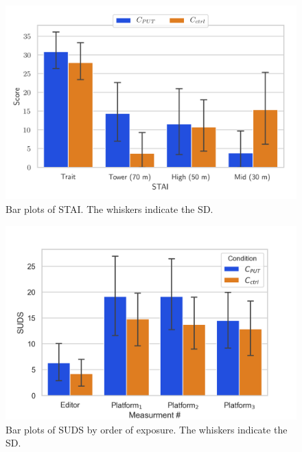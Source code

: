 
\begin{figure}[t!]
\centering
\includegraphics[width=\linewidth,keepaspectratio]{img/plots/stai.png}
\caption[]{Bar plots of STAI. The whiskers indicate the SD. \label{fig:stai}}
\end{figure}


\begin{figure}[t!]
\centering
\includegraphics[width=\linewidth,keepaspectratio]{img/plots/suds_order.png}
\caption[]{Bar plots of SUDS by order of exposure. The whiskers indicate the SD. \label{fig:suds_order}}
\end{figure}
